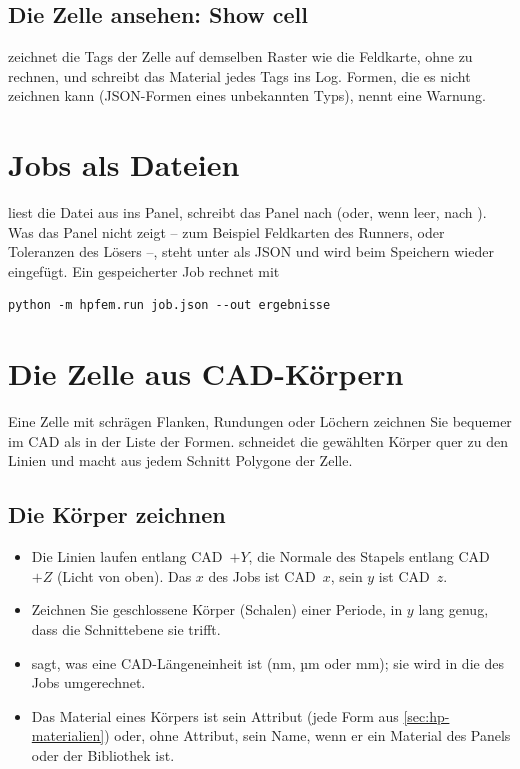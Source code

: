 \subsection{Die Zelle ansehen: Show cell}\label{sec:hp-showcell}

 zeichnet die Tags der Zelle auf demselben Raster wie die Feldkarte, ohne zu
rechnen, und schreibt das Material jedes Tags ins Log. Formen, die es nicht zeichnen kann
(JSON-Formen eines unbekannten Typs), nennt eine Warnung.

\section{Jobs als Dateien}\label{sec:hp-dateien}

 liest die Datei aus  ins Panel,  schreibt das Panel nach
 (oder, wenn leer, nach ). Was das Panel nicht zeigt -- zum Beispiel
Feldkarten des Runners,  oder Toleranzen des Lösers --, steht unter 
als JSON und wird beim Speichern wieder eingefügt. Ein gespeicherter Job rechnet mit

\begin{lstlisting}
python -m hpfem.run job.json --out ergebnisse
\end{lstlisting}

\section{Die Zelle aus CAD-Körpern}\label{sec:hp-cad}

Eine Zelle mit schrägen Flanken, Rundungen oder Löchern zeichnen Sie bequemer im CAD als in der
Liste der Formen.  schneidet die gewählten Körper quer zu den Linien
und macht aus jedem Schnitt Polygone der Zelle.

\subsection{Die Körper zeichnen}

\begin{itemize}
  \item Die Linien laufen entlang CAD~$+Y$, die Normale des Stapels entlang CAD~$+Z$ (Licht von
    oben). Das $x$ des Jobs ist CAD~$x$, sein $y$ ist CAD~$z$.
  \item Zeichnen Sie geschlossene Körper (Schalen) einer Periode, in $y$ lang genug, dass die
    Schnittebene sie trifft.
  \item {} sagt, was eine CAD-Längeneinheit ist (nm, µm oder mm); sie wird in
    die  des Jobs umgerechnet.
  \item Das Material eines Körpers ist sein Attribut  (jede Form aus
    \autoref{sec:hp-materialien}) oder, ohne Attribut, sein Name, wenn er ein Material des Panels
    oder der Bibliothek ist.
\end{itemize}

